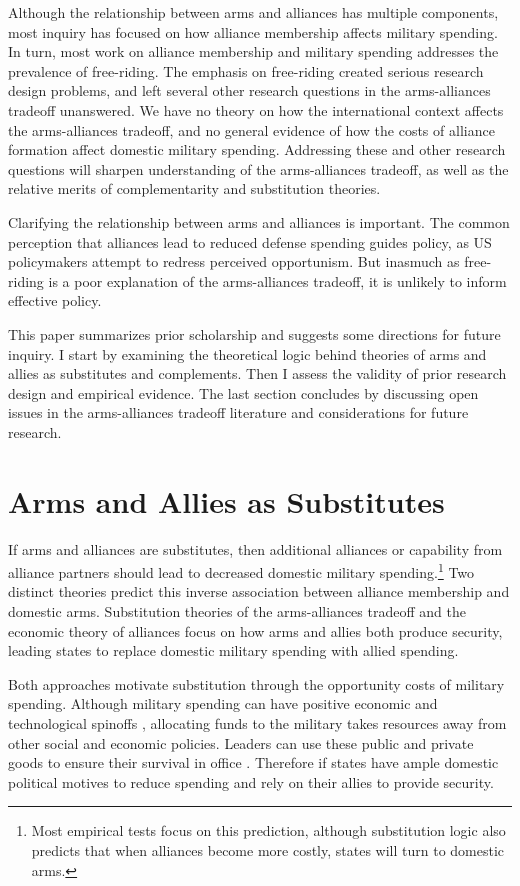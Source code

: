 \documentclass[12pt]{article}
\begin{document}
Although the relationship between arms and alliances has multiple components, most inquiry has focused on how alliance membership affects military spending. In turn, most work on alliance membership and military spending addresses the prevalence of free-riding. The emphasis on free-riding created serious research design problems, and left several other research questions in the arms-alliances tradeoff unanswered. We have no theory on how the international context affects the arms-alliances tradeoff, and no general evidence of how the costs of alliance formation affect domestic military spending. Addressing these and other research questions will sharpen understanding of the arms-alliances tradeoff, as well as the relative merits of complementarity and substitution theories. 

Clarifying the relationship between arms and alliances is important. The common perception that alliances lead to reduced defense spending guides policy, as US policymakers attempt to redress perceived opportunism. But inasmuch as free-riding is a poor explanation of the arms-alliances tradeoff, it is unlikely to inform effective policy. 

This paper summarizes prior scholarship and suggests some directions for future inquiry. I start by examining the theoretical logic behind theories of arms and allies as substitutes and complements. Then I assess the validity of prior research design and empirical evidence. The last section concludes by discussing open issues in the arms-alliances tradeoff literature and considerations for future research. 


\section*{Arms and Allies as Substitutes}

If arms and alliances are substitutes, then additional alliances or capability from alliance partners should lead to decreased domestic military spending.\footnote{Most empirical tests focus on this prediction, although substitution logic also predicts that when alliances become more costly, states will turn to domestic arms.} Two distinct theories predict this inverse association between alliance membership and domestic arms. Substitution theories of the arms-alliances tradeoff and the economic theory of alliances focus on how arms and allies both produce security, leading states to replace domestic military spending with allied spending. 

Both approaches motivate substitution through the opportunity costs of military spending. Although military spending can have positive economic and technological spinoffs \citep{DegerSen1995, WhittenWilliams2011}, allocating funds to the military takes resources away from other social and economic policies. Leaders can use these public and private goods to ensure their survival in office \citep{BDMetal2002}. Therefore if states have ample domestic political motives to reduce spending and rely on their allies to provide security. 
\end{document}
